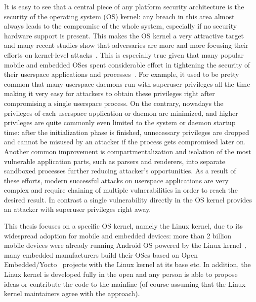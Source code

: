 \begin{quoting}
\end{quoting}

It is easy to see that a central piece of any platform security architecture is the security of the operating system (OS) kernel: any breach in this area almost always leads to the compromise of the whole system, especially if no security hardware support is present. This makes the OS kernel a very attractive target and many recent studies show that adversaries are more and more focusing their efforts on kernel-level attacks~\cite{stoep2016android}. This is especially true given that many popular mobile and embedded OSes spent considerable effort in tightening the security of their userspace applications and processes~\cite{stoep2016android}. For example, it used to be pretty common that many userspace daemons run with superuser privileges all the time making it very easy for attackers to obtain these privileges right after compromising a single userspace process. On the contrary, nowadays the privileges of each userspace application or daemon are minimized, and higher privileges are quite commonly even limited to the system or daemon startup time: after the initialization phase is finished, unnecessary privileges are dropped and cannot be misused by an attacker if the process gets compromised later on. Another common improvement is compartmentalization and isolation of the most vulnerable application parts, such as parsers and renderers, into separate sandboxed processes further reducing attacker's opportunities. As a result of these efforts, modern successful attacks on userspace applications are very complex and require chaining of multiple vulnerabilities in order to reach the desired result. In contrast a single vulnerability directly in the OS kernel provides an attacker with superuser privileges right away.

This thesis focuses on a specific OS kernel, namely the Linux kernel, due to its widespread adoption for mobile and embedded devices: more than 2 billion mobile devices were already running Android OS powered by the Linux kernel~\cite{googleio2017}, many embedded manufacturers build their OSes based on Open Embedded/Yocto~\cite{OE2017, yocto2017} projects with the Linux kernel at its base etc. 
In addition, the Linux kernel is developed fully in the open and any person is able to propose ideas or contribute the code to the mainline (of course assuming that the Linux kernel maintainers agree with the approach).

